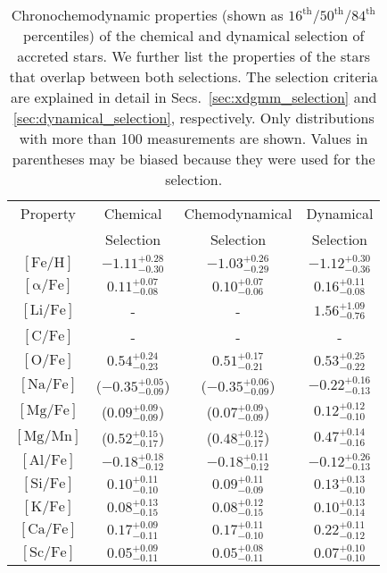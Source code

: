 \begingroup
\renewcommand{\arraystretch}{1.14}
\begin{table}
\centering
\caption{Chronochemodynamic properties (shown as $16^\text{th}$/$50^\text{th}$/$84^\text{th}$ percentiles) of the chemical and dynamical selection of accreted stars. We further list the properties of the stars that overlap between both selections. The selection criteria are explained in detail in Secs.~\ref{sec:xdgmm_selection} and \ref{sec:dynamical_selection}, respectively. Only distributions with more than 100 measurements are shown. Values in parentheses may be biased because they were used for the selection.}
\label{tab:chronochemodynamic_properties}
\begin{tabular}{cccc}
\hline
Property & Chemical & Chemodynamical & Dynamical \\
& Selection & Selection & Selection \\
\hline \hline
$\mathrm{[Fe/H]}$ & $-1.11_{-0.30}^{+0.28}$ & $-1.03_{-0.29}^{+0.26}$ & $-1.12_{-0.36}^{+0.30}$ \\
$\mathrm{[\alpha/Fe]}$ & $0.11_{-0.08}^{+0.07}$ & $0.10_{-0.06}^{+0.07}$ & $0.16_{-0.08}^{+0.11}$ \\
$\mathrm{[Li/Fe]}$ & - & - & $1.56_{-0.76}^{+1.09}$ \\
$\mathrm{[C/Fe]}$ & - & - & - \\
$\mathrm{[O/Fe]}$ & $0.54_{-0.23}^{+0.24}$ & $0.51_{-0.21}^{+0.17}$ & $0.53_{-0.22}^{+0.25}$ \\
$\mathrm{[Na/Fe]}$ & ($-0.35_{-0.09}^{+0.05}$) & ($-0.35_{-0.09}^{+0.06}$) & $-0.22_{-0.13}^{+0.16}$ \\
$\mathrm{[Mg/Fe]}$ & ($0.09_{-0.09}^{+0.09}$) & ($0.07_{-0.09}^{+0.09}$) & $0.12_{-0.10}^{+0.12}$ \\
$\mathrm{[Mg/Mn]}$ & ($0.52_{-0.17}^{+0.15}$) & ($0.48_{-0.17}^{+0.12}$) & $0.47_{-0.16}^{+0.14}$ \\
$\mathrm{[Al/Fe]}$ & $-0.18_{-0.12}^{+0.18}$ & $-0.18_{-0.12}^{+0.11}$ & $-0.12_{-0.13}^{+0.26}$ \\
$\mathrm{[Si/Fe]}$ & $0.10_{-0.10}^{+0.11}$ & $0.09_{-0.09}^{+0.11}$ & $0.13_{-0.10}^{+0.13}$ \\
$\mathrm{[K/Fe]}$ & $0.08_{-0.15}^{+0.13}$ & $0.08_{-0.15}^{+0.12}$ & $0.10_{-0.14}^{+0.13}$ \\
$\mathrm{[Ca/Fe]}$ & $0.17_{-0.11}^{+0.09}$ & $0.17_{-0.10}^{+0.11}$ & $0.22_{-0.12}^{+0.11}$ \\
$\mathrm{[Sc/Fe]}$ & $0.05_{-0.11}^{+0.09}$ & $0.05_{-0.11}^{+0.08}$ & $0.07_{-0.10}^{+0.10}$ \\

\end{tabular}
\end{table}

